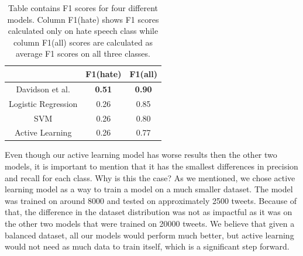 \documentclass[10pt, a4paper]{article}
\begin{document}
\begin{table}[!ht]
	\centering
	\caption{Table contains F1 scores for four different models. Column F1(hate) shows F1 scores calculated only on hate speech class while column F1(all)  scores are calculated as average F1 scores on all three classes.}
	\label{tbl:scoreAll}
	\begin{tabular}{ccc}
		\hline
		\multicolumn{1}{l}{} & \multicolumn{1}{l}{F1(hate)} & \multicolumn{1}{l}{F1(all)} \\ \hline
		Davidson et al.      & \textbf{0.51}                & \textbf{0.90}               \\ \hline
		Logistic Regression  & 0.26                         & 0.85                        \\ \hline
		SVM                  & 0.26                         & 0.80                        \\ \hline
		Active Learning      & 0.26                         & 0.77                        \\ \hline
	\end{tabular}
\end{table}
Even though our active learning model has worse results then the other two models, it is important to mention that it has the smallest differences in precision and recall for each class. Why is this the case? As we mentioned, we chose active learning model as a way to train a model on a much smaller dataset. The model was trained on around 8000 and tested on approximately 2500 tweets. Because of that, the difference in the dataset distribution was not as impactful as it was on the other two models that were trained on 20000 tweets. We believe that given a balanced dataset, all our models would perform much better, but active learning would not need as much data to train itself, which is a significant step forward.
\end{document}
